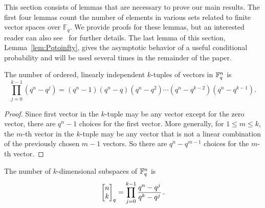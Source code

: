 This section consists of lemmas that are necessary to prove our main results. The first four lemmas count the number of elements in various sets related to finite vector spaces over $\mathbb{F}_q$.  We provide
proofs for these lemmas, but an interested reader can also
see~\cite{stanley2011enumerative} for further details. The last lemma of 
this section, Lemma~\ref{lem:Pqtoinfty}, gives the asymptotic behavior of a useful
conditional probability and will be used several times in the remainder of the
paper.

\begin{lemma}\label{NumkTup}
  The number of ordered, linearly independent $k$-tuples of vectors in $\mathbb{F}_q^{n}$  is
\[
\prod_{j=0}^{k-1} \left(q^n - q^j\right) = 
(q^n-1)(q^n-q)(q^n-q^2)\cdots(q^n - q^{k-2})(q^n-q^{k-1}).
\]
\end{lemma}

\begin{proof}
Since first vector in the $k$-tuple may be any vector except for the zero
vector, there are $q^n-1$ choices for the first vector.  More generally, for $1
\leq m \leq k$, the
$m$-th vector in the $k$-tuple may be any vector that is not a linear
combination of the previously chosen $m-1$ vectors. So there are $q^n -
q^{m-1}$ choices for the $m$-th vector.
\end{proof}

\begin{lemma}\label{NumkSub}
  The number of $k$-dimensional subspaces of $\mathbb{F}_q^{n}$ is
\[
  \begin{bmatrix}{n}\\ {k}\end{bmatrix}_q = \prod_{j=0}^{k-1} \frac{q^n-q^j}{q^k-q^j} \, .
\]
\end{lemma}

